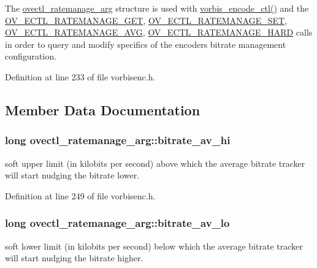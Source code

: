 The \hyperlink{structovectl__ratemanage__arg}{ovectl\+\_\+ratemanage\+\_\+arg} structure is used with \hyperlink{vorbisenc_8h_a5f398a378e20b8ce5e3341a582e773bd}{vorbis\+\_\+encode\+\_\+ctl()} and the \hyperlink{vorbisenc_8h_a614481c0d84bdfbb80eed9208b68f779}{O\+V\+\_\+\+E\+C\+T\+L\+\_\+\+R\+A\+T\+E\+M\+A\+N\+A\+G\+E\+\_\+\+G\+ET}, \hyperlink{vorbisenc_8h_a1daa1fd8ce1064cce01dde3ad447d389}{O\+V\+\_\+\+E\+C\+T\+L\+\_\+\+R\+A\+T\+E\+M\+A\+N\+A\+G\+E\+\_\+\+S\+ET}, \hyperlink{vorbisenc_8h_a34c3170d227b6368041e59c1dc7ed6e4}{O\+V\+\_\+\+E\+C\+T\+L\+\_\+\+R\+A\+T\+E\+M\+A\+N\+A\+G\+E\+\_\+\+A\+VG}, \hyperlink{vorbisenc_8h_af8869980a805f431af57a50dffbf5d33}{O\+V\+\_\+\+E\+C\+T\+L\+\_\+\+R\+A\+T\+E\+M\+A\+N\+A\+G\+E\+\_\+\+H\+A\+RD} calls in order to query and modify specifics of the encoder\textquotesingle{}s bitrate management configuration. 

Definition at line 233 of file vorbisenc.\+h.



\subsection{Member Data Documentation}
\subsubsection[{\texorpdfstring{bitrate\+\_\+av\+\_\+hi}{bitrate_av_hi}}]{\setlength{\rightskip}{0pt plus 5cm}long ovectl\+\_\+ratemanage\+\_\+arg\+::bitrate\+\_\+av\+\_\+hi}\hypertarget{structovectl__ratemanage__arg_ac1e81b5a2e705022ca895f494718ded7}{}\label{structovectl__ratemanage__arg_ac1e81b5a2e705022ca895f494718ded7}
soft upper limit (in kilobits per second) above which the average bitrate tracker will start nudging the bitrate lower. 

Definition at line 249 of file vorbisenc.\+h.

\subsubsection[{\texorpdfstring{bitrate\+\_\+av\+\_\+lo}{bitrate_av_lo}}]{\setlength{\rightskip}{0pt plus 5cm}long ovectl\+\_\+ratemanage\+\_\+arg\+::bitrate\+\_\+av\+\_\+lo}\hypertarget{structovectl__ratemanage__arg_ac241670a3a608f114acaf8f26fe4e913}{}\label{structovectl__ratemanage__arg_ac241670a3a608f114acaf8f26fe4e913}
soft lower limit (in kilobits per second) below which the average bitrate tracker will start nudging the bitrate higher. 

